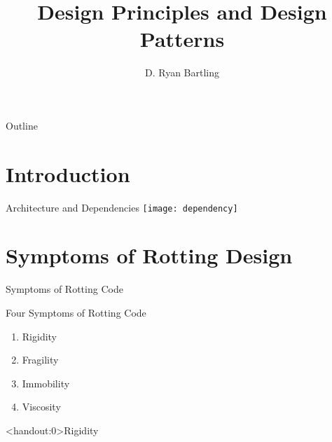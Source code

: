 \documentclass[xcolor=svgnames]{beamer}
\title
    [Design Principles\hspace{2em}]
    {Design Principles and Design Patterns}
\author
    [Ryan Bartling]
    {D. Ryan Bartling}
\begin{document}

\maketitle

\begin{frame}{Outline}
    \tableofcontents
\end{frame}


\section{Introduction}


\begin{frame}{Architecture and Dependencies}
    \centering
    \texttt{[image: dependency]}
\end{frame}


\section{Symptoms of Rotting Design}


\begin{frame}
    {Symptoms of Rotting Code}

    Four Symptoms of Rotting Code\pause

    \begin{enumerate}
        \item Rigidity\pause
        \item Fragility\pause
        \item Immobility\pause
        \item Viscosity\pause
    \end{enumerate}
\end{frame}


{%
%
\begin{frame}<handout:0>{Rigidity}
\end{frame}
}
\end{document}
